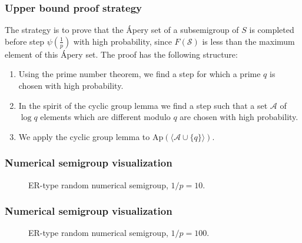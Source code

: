 \documentclass{beamer}
\begin{document}
\begin{frame}
    \frametitle{Upper bound proof strategy}
    The strategy is to prove that the Ápery set of a subsemigroup of $S$ is completed before step $\psi\left(\frac{1}{p}\right)$ with high probability, since $F(\mathcal{S})$ is less than the maximum element of this Ápery set. The proof has the following structure: 
\begin{enumerate}
\item Using the prime number theorem, we find a step for which a prime $q$ is chosen with high probability. 
\item In the spirit of the cyclic group lemma we find a step such that a set $\mathcal{A}$ of $\log q$ elements which are different modulo $q$ are chosen with high probability. 
\item We apply the cyclic group lemma to $\mathrm{Ap}(\langle \mathcal{A} \cup \{q\}\rangle)$.
\end{enumerate}
    
\end{frame}
\begin{frame}
    \frametitle{Numerical semigroup visualization}
    \begin{figure}
        \begin{center}
            \scalebox{0.8}{}
        \end{center}
        \caption{ER-type random numerical semigroup, $1/p = 10$.}
    \end{figure}

\end{frame}

\begin{frame}
    \frametitle{Numerical semigroup visualization}
    \begin{figure}
        \begin{center}
            \scalebox{0.8}{}
        \end{center}
        \caption{ER-type random numerical semigroup, $1/p = 100$.}
    \end{figure}

\end{frame}
\end{document}
